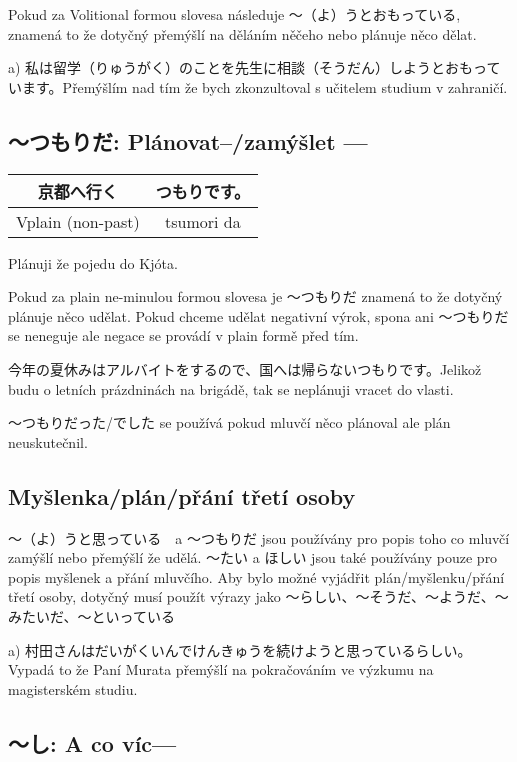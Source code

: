 Pokud za Volitional formou slovesa následuje 〜（よ）うとおもっている, znamená to že dotyčný přemýšlí na děláním něčeho nebo plánuje něco dělat.

a) 私は留学（りゅうがく）のことを先生に相談（そうだん）しようとおもっています。Přemýšlím nad tím že bych zkonzultoval s učitelem studium v zahraničí.

\subsection{〜つもりだ: Plánovat--/zamýšlet ---}
\begin{center}
\begin{tabular}{|| c | c ||}
\hline
京都へ行く　&つもりです。\\
\hline
Vplain (non-past) &tsumori da\\
\hline
\end{tabular}
\end{center}
Plánuji že pojedu do Kjóta.

Pokud za plain ne-minulou formou slovesa je 〜つもりだ znamená to že dotyčný plánuje něco udělat. Pokud chceme udělat negativní výrok, spona ani 〜つもりだ se neneguje ale negace se provádí v plain formě před tím.

今年の夏休みはアルバイトをするので、国へは帰らないつもりです。Jelikož budu o letních prázdninách na brigádě, tak se neplánuji vracet do vlasti.

〜つもりだった/でした se používá pokud mluvčí něco plánoval ale plán neuskutečnil.





\subsection{ Myšlenka/plán/přání třetí osoby}

〜（よ）うと思っている　a 〜つもりだ  jsou používány pro popis toho co mluvčí zamýšlí nebo přemýšlí že udělá. 〜たい a ほしい jsou také používány pouze pro popis myšlenek a přání mluvčího. Aby bylo možné vyjádřit plán/myšlenku/přání třetí osoby, dotyčný musí použít výrazy jako 〜らしい、〜そうだ、〜ようだ、〜みたいだ、〜といっている

a) 村田さんはだいがくいんでけんきゅうを続けようと思っているらしい。Vypadá to že Paní Murata  přemýšlí na pokračováním ve výzkumu na magisterském studiu.

\subsection{〜し: A co víc---}

